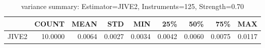 \begin{table}[ht]
\centering
\caption{variance summary: Estimator=JIVE2, Instruments=125, Strength=0.70}
\begin{tabular}{lrrrrrrrr}
\toprule
 & COUNT & MEAN & STD & MIN & 25\% & 50\% & 75\% & MAX \\
\midrule
JIVE2 & 10.0000 & 0.0064 & 0.0027 & 0.0034 & 0.0042 & 0.0060 & 0.0075 & 0.0117 \\
\bottomrule
\end{tabular}
\end{table}
